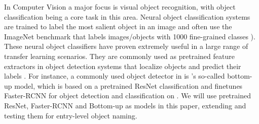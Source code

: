  


In Computer Vision a major focus is visual object recognition, with object classification being a core task in this area. 
Neural object classification systems are trained to label the most salient object in an image and often use the ImageNet \cite{imagenet_cvpr09} benchmark that labels images/objects with 1000 fine-grained classes \cite{googlenet,he2016deep}). 
These neural object classifiers have proven extremely useful in a large range of transfer learning scenarios. 
They are commonly used as pretrained feature extractors in object detection systems that localize objects and predict their labels \cite{fasterrcnn2015}.
For instance, a commonly used object detector in \lv is \citep{anderson2018updown}'s so-called bottom-up model, which is based on a pretrained ResNet classification and finetunes Faster-RCNN \cite{fasterrcnn2015} for object detection and classification on \vg. 
We will use pretrained ResNet, Faster-RCNN and Bottom-up as models in this paper, extending and testing them for entry-level object naming. 

